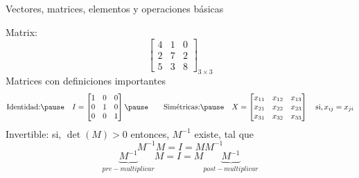 \documentclass[aspectratio=169]{beamer}
\begin{document}
\begin{frame}
 {Vectores, matrices, elementos y operaciones b\'asicas}

 Matrix:
 \begin{equation*}
  \begin{bmatrix}
   4 & 1 & 0 \\
   2 & 7 & 2 \\
   5 & 3 & 8 
  \end{bmatrix}_{3\times3}
 \end{equation*}
 \pause
Matrices con definiciones importantes
 \begin{equation*}
 \textnormal{Identidad:} \pause \quad I = \begin{bmatrix}
   1 & 0 & 0 \\
   0 & 1 & 0 \\
   0 & 0 & 1 
  \end{bmatrix} \pause \qquad 
   \textnormal{Sim\'etricas:} \pause \quad X = \begin{bmatrix}
   x_{11} & x_{12} & x_{13} \\
   x_{21} & x_{22} & x_{23} \\
   x_{31} & x_{32} & x_{33} 
  \end{bmatrix} \quad \textnormal{si}, x_{ij} = x_{ji} 
 \end{equation*} \pause
 Invertible: \pause \quad si, \quad $\det(M) > 0$ \quad entonces, \quad $M^{-1}$ existe, tal que 
 \begin{equation*}
  M^{-1}M = I = MM^{-1}
 \end{equation*}
 \pause \vskip -1.4cm
 \begin{equation*}
  \underbrace{M^{-1}}_{pre-multiplicar}M = I = M\underbrace{M^{-1}}_{post-multiplicar}
 \end{equation*}

\end{frame}
\end{document}
